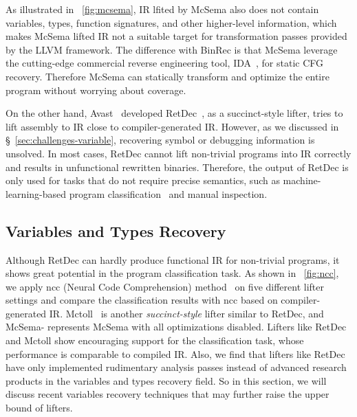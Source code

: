 As illustrated in \F~\ref{fig:mcsema}, IR lfited by McSema also does not contain variables, types, function signatures, and other higher-level information, which makes McSema lifted IR not a suitable target for transformation passes provided by the LLVM framework. The difference with BinRec is that McSema leverage the cutting-edge commercial reverse engineering tool, IDA~\cite{hex2014ida}, for static CFG recovery. Therefore McSema can statically transform and optimize the entire program without worrying about coverage.

On the other hand, Avast~\cite{avast} developed RetDec~\cite{retdec}, as a succinct-style lifter, tries to lift assembly to IR close to compiler-generated IR. However, as we discussed in \S~\ref{sec:challenges-variable}, recovering symbol or debugging information is unsolved. In most cases, RetDec cannot lift non-trivial programs into IR correctly and results in unfunctional rewritten binaries. Therefore, the output of RetDec is only used for tasks that do not require precise semantics, such as machine-learning-based program classification~\cite{ben2018neural} and manual inspection.


\subsection{Variables and Types Recovery} \label{sec:existing-recovery}
Although RetDec can hardly produce functional IR for non-trivial programs, it shows great potential in the program classification task. As shown in \F~\ref{fig:ncc}, we apply ncc (Neural Code Comprehension) method~\cite{ben2018neural} on five different lifter settings and compare the classification results with ncc based on compiler-generated IR. Mctoll~\cite{mctoll} is another \textit{succinct-style} lifter similar to RetDec, and McSema- represents McSema with all optimizations disabled. Lifters like RetDec and Mctoll show encouraging support for the classification task, whose performance is comparable to compiled IR.
Also, we find that lifters like RetDec have only implemented rudimentary analysis passes instead of advanced research products in the variables and types recovery field. So in this section, we will discuss recent variables recovery techniques that may further raise the upper bound of lifters.

